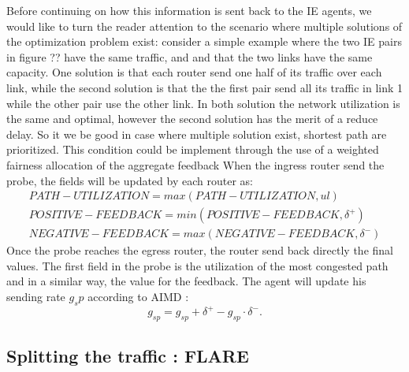 Before continuing on how this information is sent back to the IE agents, we would like to turn the reader attention to the scenario where multiple solutions of the optimization problem exist: consider a simple example where the two IE pairs in figure ?? have the same traffic, and and that the two links have the same capacity. One solution is that each router send one half of its traffic over each link, while the second solution is that the the first pair send all its traffic in link 1 while the other pair use the other link. In both solution the network utilization is the same and optimal, however the second solution has the merit of a reduce delay. So it we be good in case where multiple solution exist, shortest path are prioritized. This condition could be implement through the use of a weighted fairness allocation of the aggregate feedback 
When the ingress router send the probe, the fields will be updated by each router as:\\
\begin{eqnarray}
PATH-UTILIZATION = max (PATH-UTILIZATION, ul ) \\
POSITIVE-FEEDBACK = min (POSITIVE-FEEDBACK, \delta^+ ) \\
NEGATIVE-FEEDBACK = max (NEGATIVE-FEEDBACK, \delta^− ) 
\end{eqnarray}
Once the probe reaches the egress router, the router send back directly the final values. The first field in the probe is the utilization of the most congested path and in a similar way, the value for the feedback. The agent will update his sending rate $g_sp$ according to AIMD :
\begin{equation}
g_{sp} = g_{sp} + \delta^+ - g_{sp} \cdot \delta^-.
\end{equation}

\subsection{Splitting the traffic : FLARE}

